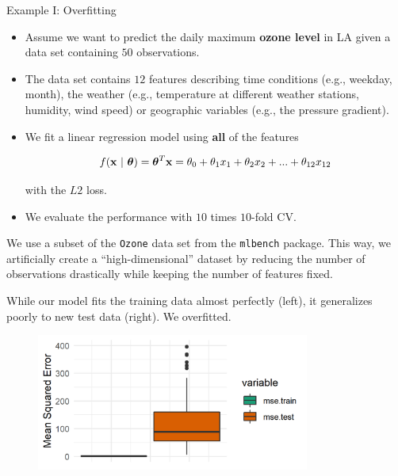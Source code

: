 \documentclass[11pt,compress,t,notes=noshow, xcolor=table]{beamer}
\begin{document}
\begin{vbframe}{Example I: Overfitting}

\begin{itemize}
\item Assume we want to predict the daily maximum \textbf{ozone level} in LA given a data set containing $50$ observations.
\item The data set contains $12$ features describing time conditions (e.g., weekday, month),
the weather (e.g., temperature at different weather stations, humidity, wind speed) or geographic variables (e.g., the pressure gradient).
\item We fit a linear regression model using \textbf{all} of the features

$$
f(\mathbf{x} ~|~ \bm{\theta}) = \bm{\theta}^T\mathbf{x} = \theta_0 + \theta_1 x_1 + \theta_2 x_2 + ... + \theta_{12} x_{12}
$$

with the $L2$ loss.

\item We evaluate the performance with $10$ times $10$-fold CV.

\end{itemize}

\vfill

\begin{footnotesize} 
We use a subset of the \texttt{Ozone} data set from the \texttt{mlbench} package. This way, we artificially create a \enquote{high-dimensional} dataset by reducing the number of observations drastically while keeping the number of features fixed. 
\end{footnotesize}

\framebreak 


While our model fits the training data almost perfectly (left), it generalizes poorly
to new test data (right). We overfitted.

\lz 

\begin{figure}
\includegraphics[width=0.8\textwidth]{figure/ozone_mse_boxplot.png}\\
\end{figure}

\end{vbframe}
\end{document}
